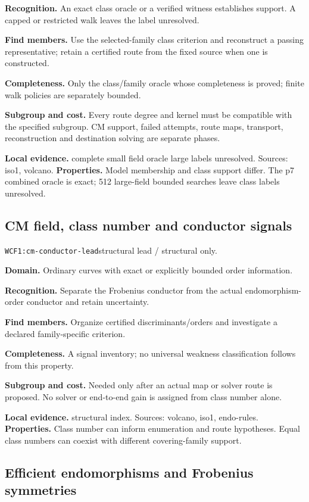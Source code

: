 \documentclass[10pt]{article}
\begin{document}
\textbf{Recognition.} An exact class oracle or a verified witness establishes support. A capped or restricted walk leaves the label unresolved.\par
\textbf{Find members.} Use the selected-family class criterion and reconstruct a passing representative; retain a certified route from the fixed source when one is constructed.\par
\textbf{Completeness.} Only the class/family oracle whose completeness is proved; finite walk policies are separately bounded.\par
\textbf{Subgroup and cost.} Every route degree and kernel must be compatible with the specified subgroup. CM support, failed attempts, route maps, transport, reconstruction and destination solving are separate phases.\par
\textbf{Local evidence.} complete small field oracle large labels unresolved. Sources: iso1, volcano.
\textbf{Properties.} Model membership and class support differ. The p7 combined oracle is exact; 512 large-field bounded searches leave class labels unresolved.\par
{}\subsection{CM field, class number and conductor signals}
\texttt{WCF1:cm-conductor-lead}\quad structural lead / structural only.\par
\textbf{Domain.} Ordinary curves with exact or explicitly bounded order information.\par
\textbf{Recognition.} Separate the Frobenius conductor from the actual endomorphism-order conductor and retain uncertainty.\par
\textbf{Find members.} Organize certified discriminants/orders and investigate a declared family-specific criterion.\par
\textbf{Completeness.} A signal inventory; no universal weakness classification follows from this property.\par
\textbf{Subgroup and cost.} Needed only after an actual map or solver route is proposed. No solver or end-to-end gain is assigned from class number alone.\par
\textbf{Local evidence.} structural index. Sources: volcano, iso1, endo-rules.
\textbf{Properties.} Class number can inform enumeration and route hypotheses. Equal class numbers can coexist with different covering-family support.\par
{}\subsection{Efficient endomorphisms and Frobenius symmetries}
\end{document}
